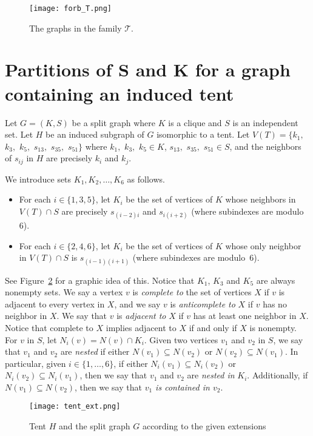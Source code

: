 \documentclass[12pt]{book}
\theoremstyle{plain}
\theoremstyle{remark}
\begin{document}
\begin{figure}[h]
\centering
\texttt{[image: forb\_T.png]} 
\caption{The graphs in the family $\mathcal{T}$.} \label{fig:forb_T_graphs}
\end{figure}

\section{Partitions of S and K for a graph containing an induced tent} \label{sec:tent_partition}


Let $G=(K,S)$ be a split graph where $K$ is a clique and $S$ is an independent set. Let $H$ be an induced subgraph of $G$ isomorphic to a tent. Let $V(T)=\{k_1,$ $k_3,$ $k_5,$ $s_{13},$ $s_{35},$ $s_{51}\}$ where $k_1,$ $k_3,$ $k_5\in K$, $s_{13},$ $s_{35},$ $s_{51}\in S$, and the neighbors of $s_{ij}$ in $H$ are precisely $k_i$ and $k_j$.

We introduce sets $K_1,K_2,\ldots,K_6$ as follows.
\begin{itemize}
 \item For each $i\in\{1,3,5\}$, let $K_i$ be the set of vertices of $K$ whose neighbors in $V(T)\cap S$ are precisely $s_{(i-2)i}$ and $s_{i(i+2)}$ (where subindexes are modulo~$6$).
 \item For each $i\in\{2,4,6\}$, let $K_i$ be the set of vertices of $K$ whose only neighbor in $V(T)\cap S$ is $s_{(i-1)(i+1)}$ (where subindexes are modulo~$6$).
\end{itemize}
See Figure~\ref{fig:tent_ext} for a graphic idea of this. Notice that $K_1$, $K_3$ and $K_5$ are always nonempty sets.
We say a vertex $v$ is \emph{complete to} the set of vertices $X$ if $v$ is adjacent to every vertex in $X$, and we say $v$ is \emph{anticomplete to} $X$ if $v$ has no neighbor in $X$.
We say that $v$ is \emph{adjacent to} $X$ if $v$ has at least one neighbor in $X$. Notice that complete to $X$ implies adjacent to $X$ if and only if $X$ is nonempty.
For $v$ in $S$, let $N_i(v) = N(v) \cap K_i$.
Given two vertices $v_1$ and $v_2$ in $S$, we say that $v_1$ and $v_2$ are \emph{nested} if either $N(v_1) \subseteq N(v_2)$ or $N(v_2) \subseteq N(v_1)$.
In particular, given $i \in \{1, \ldots, 6\}$, if either $N_{i}(v_1) \subseteq N_i(v_2)$ or $N_{i}(v_2) \subseteq N_i(v_1)$, then we say that
$v_1$ and $v_2$ are \emph{nested in} $K_i$.
Additionally, if $N(v_1) \subseteq N(v_2)$, then we say that \emph{$v_1$ is contained in $v_2$}.

\begin{figure}[h!]
	\begin{center}
		\texttt{[image: tent\_ext.png]}
	\end{center}
	\caption{Tent $H$ and the split graph $G$ according to the given extensions}
	\label{fig:tent_ext}
\end{figure}
\end{document}
